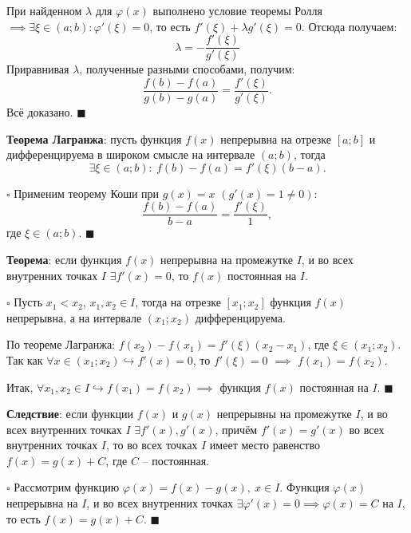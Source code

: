 \documentclass[12pt, a4paper, reqno]{article}
\begin{document}
    При найденном $\lambda$ для $\varphi(x)$ выполнено условие теоремы Ролля $\implies
    \exists\xi\in(a; b): \varphi'(\xi) = 0$, то есть $f'(\xi) + \lambda g'(\xi) = 0$. Отсюда
    получаем:
    \begin{equation*}
        \lambda = -\dfrac{f'(\xi)}{g'(\xi)}
    \end{equation*}
    Приравнивая $\lambda$, полученные разными способами, получим:
    \begin{equation*}
        \dfrac{f(b) - f(a)}{g(b) - g(a)} = \dfrac{f'(\xi)}{g'(\xi)}.
    \end{equation*}
    Всё доказано. $\blacksquare$

    \textbf{Теорема Лагранжа}: пусть функция $f(x)$ непрерывна на отрезке $[a; b]$ и дифференцируема
    в широком смысле на интервале $(a; b)$, тогда
    \begin{equation*}
        \exists\xi\in(a; b):\ f(b) - f(a) = f'(\xi)(b - a).
    \end{equation*}

    $\square$ Применим теорему Коши при $g(x) = x$ $(g'(x) = 1 \neq 0)$:
    \begin{equation*}
        \dfrac{f(b) - f(a)}{b - a} = \dfrac{f'(\xi)}{1},
    \end{equation*}
    где $\xi\in(a; b)$. $\blacksquare$

    \textbf{Теорема}: если функция $f(x)$ непрерывна на промежутке $I$, и во всех внутренних точках
    $I$ $\exists f'(x) = 0$, то $f(x)$ постоянная на $I$.

    $\square$ Пусть $x_1 < x_2$, $x_1, x_2\in I$, тогда на отрезке $[x_1; x_2]$ функция $f(x)$
    непрерывна, а на интервале $(x_1; x_2)$ дифференцируема.

    По теореме Лагранжа: $f(x_2) - f(x_1) = f'(\xi)(x_2 - x_1)$, где $\xi\in(x_1; x_2)$. Так как
    $\forall x\in(x_1; x_2)\hookrightarrow f'(x) = 0$, то $f'(\xi) = 0$ $\implies$ $f(x_1) = f(x_2)$.

    Итак, $\forall x_1, x_2\in I\hookrightarrow f(x_1) = f(x_2) \implies$ функция $f(x)$ постоянная
    на $I$. $\blacksquare$

    \textbf{Следствие}: если функции $f(x)$ и $g(x)$ непрерывны на промежутке $I$, и во всех
    внутренних точках $I$ $\exists f'(x), g'(x)$, причём $f'(x) = g'(x)$ во всех внутренних точках
    $I$, то во всех точках $I$ имеет место равенство $f(x) = g(x) + C$, где $C$ -- постоянная.

    $\square$ Рассмотрим функцию $\varphi(x) = f(x) - g(x),\ x\in I$. Функция $\varphi(x)$
    непрерывна на $I$, и во всех внутренних точках $\exists \varphi'(x) = 0 \implies \varphi(x) = C$
    на $I$, то есть $f(x) = g(x) + C$. $\blacksquare$
\end{document}
